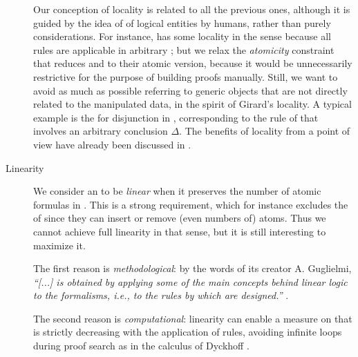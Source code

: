 \begin{scope}
\begin{scope}
\begin{description}
    Our conception of locality is related to all the previous ones, although it
    is guided by the idea of  of logical entities by
    humans, rather than purely  considerations. For
    instance,  has some locality in the  sense because
    all rules are applicable in arbitrary ; but we relax the
    \emph{atomicity} constraint that reduces  and
     to their atomic version, because it would be
    unnecessarily restrictive for the purpose of building proofs manually.
    Still, we want to avoid as much as possible referring to generic objects
    that are not directly related to the manipulated data, in the spirit of
    Girard's locality. A typical example is the   for disjunction in , corresponding to the
    {\kl{\lor{-}}} rule of  that involves an arbitrary conclusion
    $\Delta$. The benefits of locality from a  point of view have already
    been discussed in .
  \item[Linearity] 
    We consider an  to be \emph{linear} when it preserves the
    number of atomic formulas in . This is a strong requirement,
    which for instance excludes the  of  since they can
    insert or remove (even numbers of) atoms. Thus we cannot achieve full
    linearity in that sense, but it is still interesting to maximize it.
    
    The first reason is \emph{methodological}: by the words of its creator A.
    Guglielmi, \textit{``[...]  is obtained by applying some
    of the main concepts behind linear logic to the formalisms, i.e., to the
    rules by which  are designed.''}
    .
    
    The second reason is \emph{computational}: linearity can enable a measure on
     that is strictly decreasing with the application of rules,
    avoiding infinite loops during proof search as in the calculus  of
    Dyckhoff \cite{dyckhoff_contraction-free_1992}.
    

\end{description}
\end{scope}
\end{scope}
